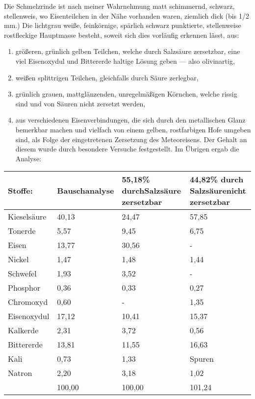 \documentclass[a4paper, 11pt, oneside]{article}
\begin{document}
Die Schmelzrinde ist nach meiner Wahrnehmung matt schimmernd, schwarz, stellenweis, wo Eisenteilchen in der Nähe vorhanden waren, ziemlich dick (bis 1/2 mm.) Die lichtgrau weiße, feinkörnige, spärlich schwarz punktierte, stellenweise rostfleckige Hauptmasse besteht, soweit sich dies vorläufig erkennen lässt, aus:
\begin{enumerate}
    \item größeren, grünlich gelben Teilchen, welche durch Salzsäure zersetzbar, eine viel Eisenoxydul und Bittererde haltige Lösung geben — also olivinartig,
    \item weißen splittrigen Teilchen, gleichfalls durch Säure zerlegbar,
    \item grünlich grauen, mattglänzenden, unregelmäßigen Körnchen, welche rissig sind und von Säuren nicht zersetzt werden,
    \item aus verschiedenen Eisenverbindungen, die sich durch den metallischen Glanz bemerkbar machen und vielfach von einem gelben, rostfarbigen Hofe umgeben sind, als Folge der eingetretenen Zersetzung des Meteoreisens. Der Gehalt an diesem wurde durch besondere Versuche festgestellt. Im Übrigen ergab die Analyse:
\end{enumerate}
\begin{center}
\begin{tabular}{ |p{19mm}|p{22mm}|p{33mm}|p{33mm}| }
    \hline
    Stoffe: & Bauschanalyse & 55,18\% durch\newline Salzsäure zersetzbar & 44,82\% durch Salzsäurenicht zersetzbar\\
    \hline\hline
    Kieselsäure & 40,13 & 24,47 & 57,85\\\hline
    Tonerde & 5,57 & 9,45 & 6,75\\\hline
    Eisen & 13,77 & 30,56 & -\\\hline
    Nickel & 1,47 & 1,48 & 1,44\\\hline
    Schwefel & 1,93 & 3,52 & -\\\hline
    Phosphor & 0,36 & 0,33 & 0,27\\\hline
    Chromoxyd & 0,60 & - & 1,35\\\hline
    Eisenoxydul & 17,12 & 10,41 & 15,37\\\hline
    Kalkerde & 2,31 & 3,72 & 0,56\\\hline
    Bittererde & 13,81 & 11,55 & 16,63\\\hline
    Kali & 0,73 & 1,33 & Spuren\\\hline
    Natron & 2,20 & 3,18 & 1,02\\\hline
    & 100,00 & 100,00 & 101,24\\
    \hline
\end{tabular}
\end{center}
\end{document}
